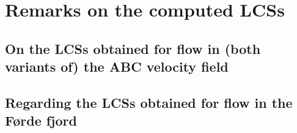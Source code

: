 \section{Remarks on the computed LCSs}
\label{sec:remarks_on_the_computed_lcss}

\subsection{On the LCSs obtained for flow in (both variants of) the ABC
velocity field}
\label{sub:on_the_lcss_obtained_for_flow_in_both_variants_of_the_abc_velocity_field}

\subsection{Regarding the LCSs obtained for flow in the Førde fjord}
\label{sub:regarding_the_lcss_obtained_for_flow_in_the_forde_fjord}




